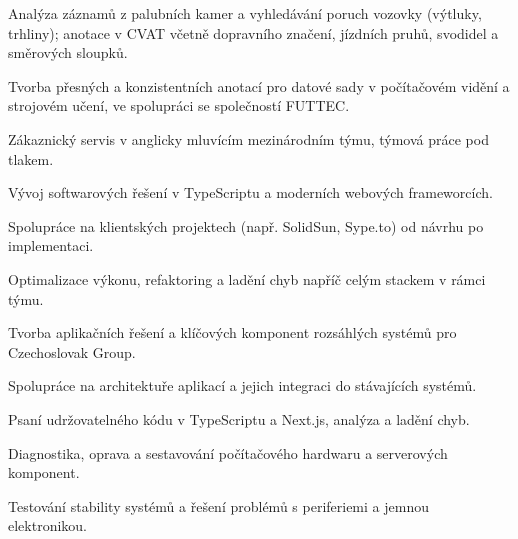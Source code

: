 \documentclass[10pt,a4paper]{article}
\begin{document}
\begin{cvlist}
  \item Analýza záznamů z palubních kamer a vyhledávání poruch vozovky (výtluky, trhliny); anotace v CVAT včetně dopravního značení, jízdních pruhů, svodidel a směrových sloupků.
  \item Tvorba přesných a konzistentních anotací pro datové sady v počítačovém vidění a strojovém učení, ve spolupráci se společností FUTTEC.
\end{cvlist}

\begin{cvlist}
  \item Zákaznický servis v anglicky mluvícím mezinárodním týmu, týmová práce pod tlakem.
\end{cvlist}

\newpage
{}
\begin{cvlist}
  \item Vývoj softwarových řešení v TypeScriptu a moderních webových frameworcích.
  \item Spolupráce na klientských projektech (např. SolidSun, Sype.to) od návrhu po implementaci.
  \item Optimalizace výkonu, refaktoring a ladění chyb napříč celým stackem v rámci týmu.
\end{cvlist}

\begin{cvlist}
  \item Tvorba aplikačních řešení a klíčových komponent rozsáhlých systémů pro Czechoslovak Group.
  \item Spolupráce na architektuře aplikací a jejich integraci do stávajících systémů.
  \item Psaní udržovatelného kódu v TypeScriptu a Next.js, analýza a ladění chyb.
\end{cvlist}

\begin{cvlist}
  \item Diagnostika, oprava a sestavování počítačového hardwaru a serverových komponent.
  \item Testování stability systémů a řešení problémů s periferiemi a jemnou elektronikou.
\end{cvlist}
\end{document}

